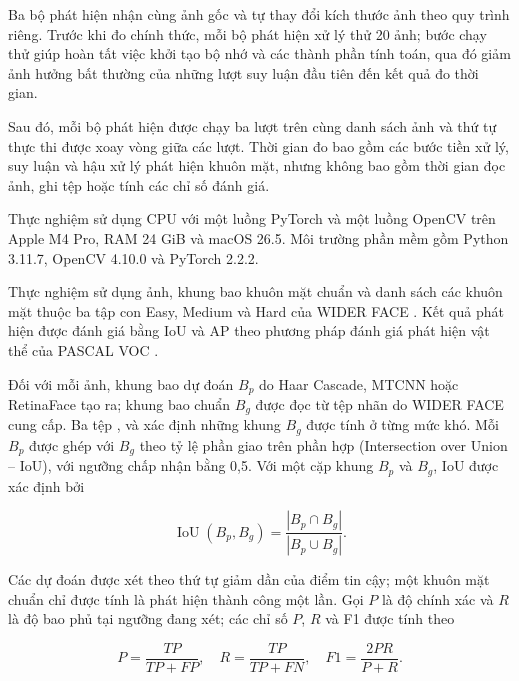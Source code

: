\documentclass[../LuanVan.tex]{subfiles}
\begin{document}
Ba bộ phát hiện nhận cùng ảnh gốc và tự thay đổi kích thước ảnh theo quy trình riêng. Trước khi đo chính thức, mỗi bộ phát hiện xử lý thử 20 ảnh; bước chạy thử giúp hoàn tất việc khởi tạo bộ nhớ và các thành phần tính toán, qua đó giảm ảnh hưởng bất thường của những lượt suy luận đầu tiên đến kết quả đo thời gian.

Sau đó, mỗi bộ phát hiện được chạy ba lượt trên cùng danh sách ảnh và thứ tự thực thi được xoay vòng giữa các lượt. Thời gian đo bao gồm các bước tiền xử lý, suy luận và hậu xử lý phát hiện khuôn mặt, nhưng không bao gồm thời gian đọc ảnh, ghi tệp hoặc tính các chỉ số đánh giá.

Thực nghiệm sử dụng CPU với một luồng PyTorch và một luồng OpenCV trên Apple M4 Pro, RAM 24 GiB và macOS 26.5. Môi trường phần mềm gồm Python 3.11.7, OpenCV 4.10.0 và PyTorch 2.2.2.

Thực nghiệm sử dụng ảnh, khung bao khuôn mặt chuẩn và danh sách các khuôn mặt thuộc ba tập con Easy, Medium và Hard của WIDER FACE \cite{yang2016wider,widerFaceEvaluation}. Kết quả phát hiện được đánh giá bằng IoU và AP theo phương pháp đánh giá phát hiện vật thể của PASCAL VOC \cite{everingham2010pascal,yang2016wider}.

Đối với mỗi ảnh, khung bao dự đoán $B_p$ do Haar Cascade, MTCNN hoặc RetinaFace tạo ra; khung bao chuẩn $B_g$ được đọc từ tệp nhãn  do WIDER FACE cung cấp. Ba tệp ,  và  xác định những khung $B_g$ được tính ở từng mức khó. Mỗi $B_p$ được ghép với $B_g$ theo tỷ lệ phần giao trên phần hợp (Intersection over Union -- IoU), với ngưỡng chấp nhận bằng 0,5. Với một cặp khung $B_p$ và $B_g$, IoU được xác định bởi

\begin{equation}
    \operatorname{IoU}(B_p,B_g)=\frac{|B_p\cap B_g|}{|B_p\cup B_g|}.
    \label{eq:iou}
\end{equation}

Các dự đoán được xét theo thứ tự giảm dần của điểm tin cậy; một khuôn mặt chuẩn chỉ được tính là phát hiện thành công một lần. Gọi $P$ là độ chính xác và $R$ là độ bao phủ tại ngưỡng đang xét; các chỉ số $P$, $R$ và F1 được tính theo \cite{everingham2010pascal,vanRijsbergen1979}

\begin{equation}
    P=\frac{TP}{TP+FP},\quad
    R=\frac{TP}{TP+FN},\quad
    F1=\frac{2PR}{P+R}.
    \label{eq:detection_metrics}
\end{equation}
\end{document}
